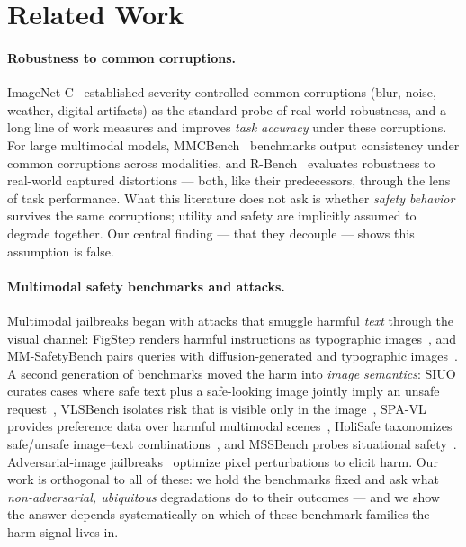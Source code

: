 \section{Related Work}
\label{sec:related}

\paragraph{Robustness to common corruptions.}
ImageNet-C~\cite{hendrycks2019benchmarking} established severity-controlled common corruptions (blur, noise, weather, digital artifacts) as the standard probe of real-world robustness, and a long line of work measures and improves \emph{task accuracy} under these corruptions. For large multimodal models, MMCBench~\cite{zhang2024mmcbench} benchmarks output consistency under common corruptions across modalities, and R-Bench~\cite{li2024rbench} evaluates robustness to real-world captured distortions --- both, like their predecessors, through the lens of task performance. What this literature does not ask is whether \emph{safety behavior} survives the same corruptions; utility and safety are implicitly assumed to degrade together. Our central finding --- that they decouple --- shows this assumption is false.

\paragraph{Multimodal safety benchmarks and attacks.}
Multimodal jailbreaks began with attacks that smuggle harmful \emph{text} through the visual channel: FigStep renders harmful instructions as typographic images~\cite{gong2023figstep}, and MM-SafetyBench pairs queries with diffusion-generated and typographic images~\cite{liu2024mmsafetybench}. A second generation of benchmarks moved the harm into \emph{image semantics}: SIUO curates cases where safe text plus a safe-looking image jointly imply an unsafe request~\cite{siuo2024}, VLSBench isolates risk that is visible only in the image~\cite{hu2024vlsbench}, SPA-VL provides preference data over harmful multimodal scenes~\cite{zhang2024spavl}, HoliSafe taxonomizes safe/unsafe image--text combinations~\cite{holisafe2025}, and MSSBench probes situational safety~\cite{zhou2024mssbench}. Adversarial-image jailbreaks~\cite{qi2024visual} optimize pixel perturbations to elicit harm. Our work is orthogonal to all of these: we hold the benchmarks fixed and ask what \emph{non-adversarial, ubiquitous} degradations do to their outcomes --- and we show the answer depends systematically on which of these benchmark families the harm signal lives in.

